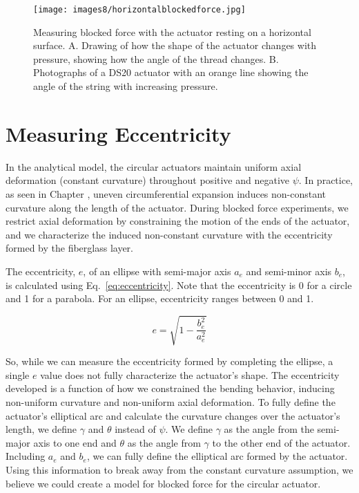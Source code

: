 \begin{figure}[ht]
    \centering
     \texttt{[image: images8/horizontalblockedforce.jpg]}
    \caption{Measuring blocked force with the actuator resting on a horizontal surface. A. Drawing of how the shape of the actuator changes with pressure, showing how the angle of the thread changes. B. Photographs of a DS20 actuator with an orange line showing the angle of the string with increasing pressure.}
    \label{fig:horizontalblockedforce}
\end{figure}

\clearpage
\section{Measuring Eccentricity}
\label{section:eccentricity}

In the analytical model, the circular actuators maintain uniform axial deformation (constant curvature) throughout positive and negative $\psi$. In practice, as seen in Chapter \label{chapter:angleresults}, uneven circumferential expansion induces non-constant curvature along the length of the actuator. During blocked force experiments, we restrict axial deformation by constraining the motion of the ends of the actuator, and we characterize the induced non-constant curvature with the eccentricity formed by the fiberglass layer. 

The eccentricity, $e$, of an ellipse with semi-major axis $a_e$ and semi-minor axis $b_e$, is calculated using Eq.~\ref{eq:eccentricity}. Note that the eccentricity is 0 for a circle and 1 for a parabola. For an ellipse, eccentricity ranges between 0 and 1. 

\begin{equation}
    e = \sqrt{1-\frac{b_e^2}{a_e^2}}
    \label{eq:eccentricity}
\end{equation} 

So, while we can measure the eccentricity formed by completing the ellipse, a single $e$ value does not fully characterize the actuator's shape. The eccentricity developed is a function of how we constrained the bending behavior, inducing non-uniform curvature and non-uniform axial deformation. To fully define the actuator's elliptical arc and calculate the curvature changes over the actuator's length, we define $\gamma$ and $\theta$ instead of $\psi$. We define $\gamma$ as the angle from the semi-major axis to one end and $\theta$ as the angle from $\gamma$ to the other end of the actuator. Including $a_e$ and $b_e$, we can fully define the elliptical arc formed by the actuator. Using this information to break away from the constant curvature assumption, we believe we could create a model for blocked force for the circular actuator. 

